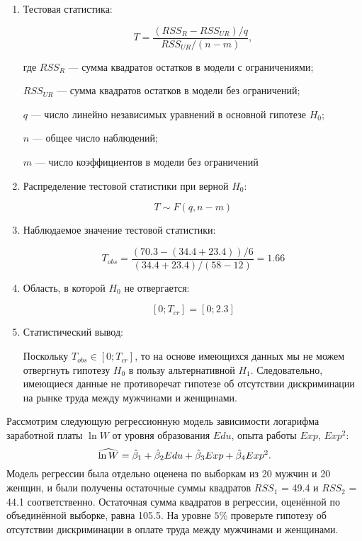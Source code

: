 \begin{problem}
\begin{sol}
\begin{enumerate}
\item Тестовая статистика:

\[
T = \frac{(RSS_R-RSS_{UR})/q}{RSS_{UR}/(n-m)},
\]

где $RSS_R$ — сумма квадратов остатков в модели с ограничениями;

$RSS_{UR}$ — сумма квадратов остатков в модели без ограничений;

$q$ — число линейно независимых уравнений в основной гипотезе $H_0$;

$n$ — общее число наблюдений;

$m$ — число коэффициентов в модели без ограничений

\item Распределение тестовой статистики при верной $H_0$:

\[
T \sim F(q, n-m)
\]

\item Наблюдаемое значение тестовой статистики:

\[
T_{obs} = \frac{(70.3-(34.4+23.4))/6}{(34.4+23.4)/(58-12)}=1.66
\]

\item Область, в которой $H_0$ не отвергается:

\[
[0;T_{cr}]=[0;2.3]
\]

\item Статистический вывод:

Поскольку $T_{obs} \in [0;T_{cr}]$, то на основе имеющихся данных мы не можем отвергнуть гипотезу $H_0$ в пользу альтернативной $H_1$. Следовательно, имеющиеся данные не противоречат гипотезе об отсутствии дискриминации на рынке труда между мужчинами и женщинами.

\end{enumerate}
\end{sol}
\end{problem}


\begin{problem}  %
 Рассмотрим следующую регрессионную модель зависимости логарифма заработной платы $\ln W$ от уровня образования $Edu$, опыта работы $Exp$, $Exp^2$:
\[
\widehat{\ln W}=\hat{\beta}_1+\hat{\beta}_2Edu+\hat{\beta}_3Exp+\hat{\beta}_4Exp^2.
\]
Модель регрессии была отдельно оценена по выборкам из 20 мужчин и 20 женщин, и были получены остаточные суммы квадратов $RSS_1$ = 49.4 и $RSS_2$ = 44.1 соответственно. Остаточная сумма квадратов в регрессии, оценённой по объединённой выборке, равна 105.5. На уровне $ 5\%$ проверьте гипотезу об отсутствии дискриминации в оплате труда между мужчинами и женщинами.


\begin{sol}
\end{sol}
\end{problem}



